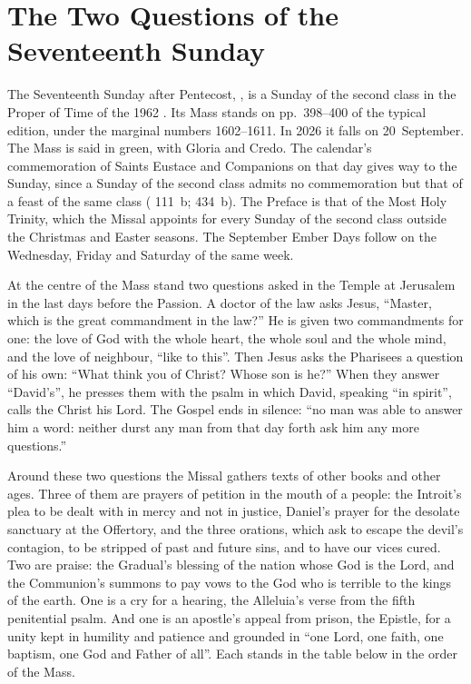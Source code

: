 \section{The Two Questions of the Seventeenth Sunday}
\label{sec:opening}

The Seventeenth Sunday after Pentecost, , is a Sunday of the second class in the Proper of Time of the 1962
. Its Mass stands on pp.~398--400 of the typical
edition, under the marginal numbers 1602--1611. In 2026 it falls on
20~September. The Mass is said in green, with Gloria and Credo. The calendar's
commemoration of Saints Eustace and Companions on that day gives way to the
Sunday, since a Sunday of the second class admits no commemoration but that
of a feast of the same class ( 111~b;  434~b). The Preface is that of the Most Holy Trinity, which
the Missal appoints for every Sunday of the second class outside the Christmas
and Easter seasons. The September Ember Days follow on the Wednesday, Friday
and Saturday of the same week.

At the centre of the Mass stand two questions asked in the Temple at
Jerusalem in the last days before the Passion. A doctor of the law asks Jesus,
``Master, which is the great commandment in the law?'' He is given two
commandments for one: the love of God with the whole heart, the whole soul and
the whole mind, and the love of neighbour, ``like to this''. Then Jesus asks
the Pharisees a question of his own: ``What think you of Christ? Whose son is
he?'' When they answer ``David's'', he presses them with the psalm in which
David, speaking ``in spirit'', calls the Christ his Lord. The Gospel ends in
silence: ``no man was able to answer him a word: neither durst any man from
that day forth ask him any more questions.''

Around these two questions the Missal gathers texts of other books and other
ages. Three of them are prayers of petition in the mouth of a people: the
Introit's plea to be dealt with in mercy and not in justice, Daniel's prayer
for the desolate sanctuary at the Offertory, and the three orations, which ask
to escape the devil's contagion, to be stripped of past and future sins, and to
have our vices cured. Two are praise: the Gradual's blessing of the nation
whose God is the Lord, and the Communion's summons to pay vows to the God who
is terrible to the kings of the earth. One is a cry for a hearing, the
Alleluia's verse from the fifth penitential psalm. And one is an apostle's
appeal from prison, the Epistle, for a unity kept in humility and patience and
grounded in ``one Lord, one faith, one baptism, one God and Father of all''.
Each stands in the table below in the order of the Mass.

